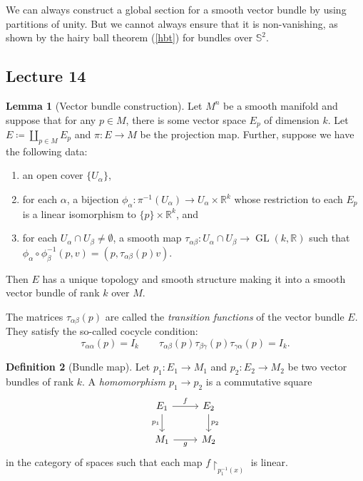 \documentclass[10pt,letterpaper,cm]{nupset}
\theoremstyle{definition}
\newtheorem{definition}{Definition}[subsection]
\theoremstyle{theorem}
\newtheorem{lemma}[definition]{Lemma}
\theoremstyle{remark}
\newcommand{\R}{\mathbb R}
\renewcommand{\S}{\mathbb S}
\newcommand{\1}{\mathbf{1}}
\newcommand{\0}{\vec 0}
\DeclareMathOperator{\GL}{GL}
\begin{document}
We can always construct a global section for a smooth vector bundle by using partitions of unity. But we cannot always ensure that it is non-vanishing, as shown by the hairy ball theorem (\cref{hbt}) for bundles over $\S^2$.


\subsection{Lecture 14}

\begin{lemma}[Vector bundle construction]
Let $M^n$ be a smooth manifold and suppose that for any $p\in M$, there is some vector space $E_p$ of dimension $k$. Let $E\coloneqq  \coprod_{p\in M} E_p$ and $\pi : E \to M$ be the projection map. Further, suppose we have the following data:
\begin{enumerate}[label=(\alph*)]
\item an open cover $\{U_{\alpha}\}$,
\item for each $\alpha$, a bijection $\phi_{\alpha} : \pi^{-1}(U_{\alpha}) \to U_{\alpha} \times \R^k$ whose restriction to each $E_p$ is a linear isomorphism to $\{p\}\times \R^k$, and
\item for each $U_{\alpha} \cap U_{\beta} \ne \emptyset$, a smooth map $\tau_{\alpha \beta} : U_{\alpha} \cap U_{\beta} \to \GL(k , \R)$ such that $\phi_{\alpha} \circ \phi_{\beta}^{-1}(p, v) = \left(p, \tau_{\alpha \beta}(p)v\right)$.
\end{enumerate}
Then $E$ has a unique topology and smooth structure making it into a smooth vector bundle of rank $k$ over $M$.
\end{lemma}

The matrices $\tau_{\alpha \beta}(p)$ are called the \textit{transition functions} of the vector bundle $E$. They satisfy the so-called cocycle condition: 
\[ \tau_{\alpha \alpha}(p) = I_k \quad \quad \tau_{\alpha \beta}(p)\tau_{\beta \gamma}(p)\tau_{\gamma \alpha}(p) = I_k.\]

\begin{definition}[Bundle map]
Let $p_1 : E_1 \to M_1$ and $p_2 : E_2 \to M_2$ be two vector bundles of rank $k$. A \textit{homomorphism $p_1 \to p_2$} is a commutative square
\[
\begin{tikzcd}
E_1 \arrow[d, "p_1"'] \arrow[r, "f"] & E_2 \arrow[d, "p_2"] \\
M_1 \arrow[r, "g"']                  & M_2                 
\end{tikzcd}
\] in the category of spaces such that each map $f\restriction_{p_1^{-1}(x)}$ is  linear. 
\end{definition}
\end{document}
